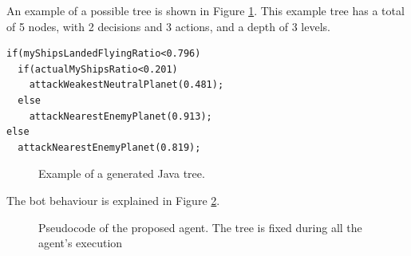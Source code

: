An example of a possible tree is shown in Figure \ref{fig:java}. This example tree has a total of 5 nodes, with 2 decisions and 3 actions, and a depth of 3 levels.


\newsavebox{\javaboxrts}
\begin{lrbox}{\javaboxrts}
\begin{minipage}{10cm}
\begin{verbatim}
if(myShipsLandedFlyingRatio<0.796)
  if(actualMyShipsRatio<0.201)
    attackWeakestNeutralPlanet(0.481);
  else
    attackNearestEnemyPlanet(0.913);
else
  attackNearestEnemyPlanet(0.819);
\end{verbatim}
\end{minipage}
\end{lrbox}

\begin{figure} 
\usebox{\javaboxrts}
\caption{Example of a generated Java tree.}
\label{fig:java}
\end{figure}

The bot behaviour is explained in Figure \ref{alg:turn}.

\newsavebox{\algoartsbox}
\begin{lrbox}{\algoartsbox}
\end{lrbox}

\begin{figure}
\usebox{\algoartsbox}
\caption{Pseudocode of the proposed agent. The tree is fixed during all the agent's execution}
\label{alg:turn}
\end{figure}






